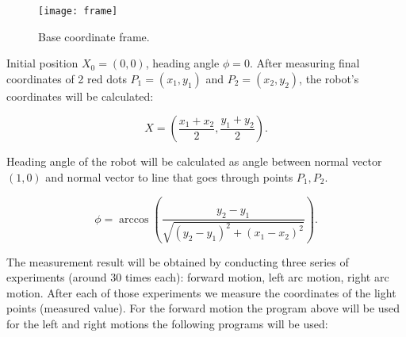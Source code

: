 \documentclass[a4paper, 12pt]{article}
\begin{document}
\begin{figure}[h]
  \centering
  \caption{Base coordinate frame.\label{fig:frame}}
  \texttt{[image: frame]}
\end{figure}

Initial position $X_0 = (0,0)$, heading angle $\phi = 0$. After measuring final coordinates of 2 red dots $P_1 = (x_1,y_1)$ and $P_2=(x_2,y_2)$, the robot's coordinates will be calculated:

\begin{equation}
X = (\frac{x_1+x_2}{2},\frac{y_1+y_2}{2}).
\end{equation}

Heading angle of the robot will be calculated as angle between normal vector $(1,0)$ and normal vector to line that goes through points $P_1,P_2.$

\begin{equation}
\phi = \arccos(\frac{y_2-y_1}{\sqrt{(y_2-y_1)^2+(x_1-x_2)^2}}).
\end{equation}


The measurement result will be obtained by conducting three series of experiments (around 30 times each): forward motion, left arc motion, right arc motion. After each of those experiments we measure the coordinates of the light points (measured value).  For the forward motion the program above will be used for the left and right motions the following programs will be used:
\end{document}
